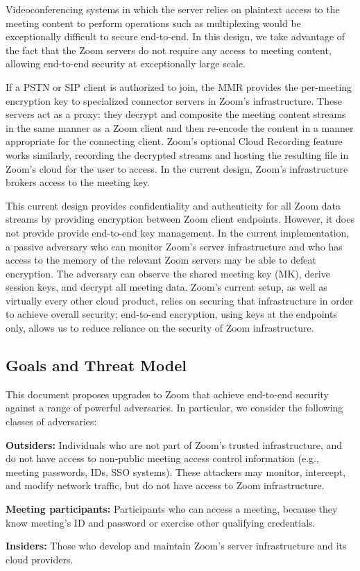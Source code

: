 Videoconferencing systems in which the server relies on plaintext access to the meeting content to perform operations such as multiplexing would be exceptionally difficult to secure end-to-end. In this design, we take advantage of the fact that the Zoom servers do not require any access to meeting content, allowing end-to-end security at exceptionally large scale. 

If a PSTN or SIP client is authorized to join, the MMR provides the per-meeting encryption key to specialized connector servers in Zoom's infrastructure. These servers act as a proxy: they decrypt and composite the meeting content streams in the same manner as a Zoom client and then re-encode the content in a manner appropriate for the connecting client. Zoom's optional Cloud Recording feature works similarly, recording the decrypted streams and hosting the resulting file in Zoom's cloud for the user to access. In the current design, Zoom's infrastructure brokers access to the meeting key.

This current design provides confidentiality and authenticity for all Zoom data streams by providing
encryption between Zoom client endpoints. However, it does not provide provide end-to-end key
management. In the current implementation, a passive adversary who can monitor Zoom's server
infrastructure and who has access to the memory of the relevant Zoom servers may be able to defeat
encryption. The adversary can observe the shared meeting key (MK), derive session keys, and decrypt
all meeting data. Zoom's current setup, as well as virtually every other cloud product, relies on
securing that infrastructure in order to achieve overall security; end-to-end encryption, using keys
at the endpoints only, allows us to reduce reliance on the security of Zoom infrastructure.

\subsection{Goals and Threat Model}
This document proposes upgrades to Zoom that achieve end-to-end security against a range of powerful adversaries. In particular, we consider the following classes of adversaries:

\begin{description}
	\item {\bf Outsiders:} Individuals who are not part of Zoom's trusted infrastructure, and do not have access to non-public meeting access control information  (e.g., meeting passwords, IDs, SSO systems). These attackers may monitor, intercept, and modify network traffic, but do not have access to Zoom infrastructure.
	\item {\bf Meeting participants:} Participants who can access a meeting, because they know meeting's ID and password or exercise other qualifying credentials.
	\item {\bf Insiders:} Those who develop and maintain Zoom's server infrastructure and its cloud providers.
\end{description}

